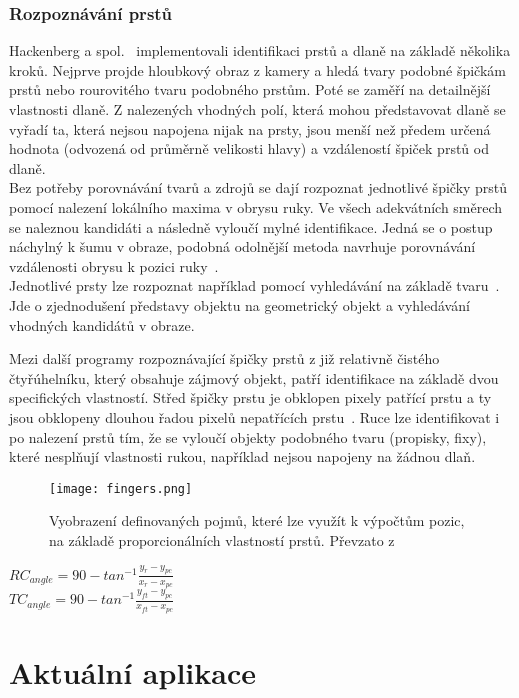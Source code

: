 \subsubsection{Rozpoznávání prstů}
Hackenberg a spol.~\cite{12} implementovali identifikaci prstů a dlaně na základě několika kroků. Nejprve projde hloubkový obraz z kamery a hledá tvary podobné špičkám prstů nebo rourovitého tvaru podobného prstům. Poté se zaměří na detailnější vlastnosti dlaně. Z nalezených vhodných polí, která mohou představovat dlaně se vyřadí ta, která nejsou napojena nijak na prsty, jsou menší než předem určená hodnota (odvozená od průměrně velikosti hlavy) a vzdáleností špiček prstů od dlaně.\\


Bez potřeby porovnávání tvarů a zdrojů se dají rozpoznat jednotlivé špičky prstů pomocí nalezení lokálního maxima v obrysu ruky. Ve všech adekvátních směrech se naleznou kandidáti a následně vyloučí mylné identifikace. Jedná se o postup náchylný k šumu v obraze, podobná odolnější metoda navrhuje porovnávání vzdálenosti obrysu k pozici ruky~\cite{3}.\\
Jednotlivé prsty lze rozpoznat například pomocí vyhledávání na základě tvaru~\cite{4}. Jde o zjednodušení představy objektu na geometrický objekt a vyhledávání vhodných kandidátů v obraze. 

Mezi další programy rozpoznávající špičky prstů z již relativně čistého čtyřúhelníku, který obsahuje zájmový objekt, patří identifikace na základě dvou specifických vlastností. Střed špičky prstu je obklopen pixely patřící prstu a ty jsou obklopeny dlouhou řadou pixelů nepatřících prstu~\cite{14}. Ruce lze identifikovat i po nalezení prstů tím, že se vyloučí objekty podobného tvaru (propisky, fixy), které nesplňují vlastnosti rukou, například nejsou napojeny na žádnou dlaň.

\begin{figure}[h]
\centering
\texttt{[image: fingers.png]}
\caption{Vyobrazení definovaných pojmů, které lze využít k výpočtům pozic, na základě proporcionálních vlastností prstů.
Převzato z ~\cite{13} }
\label{pic8}
\end{figure}
\begin{center}
$RC_{angle} = 90 - tan^{-1} \frac{y_{r}-y_{pc}}{x_{r} - x_{pc}}$ \\
$TC_{angle} = 90 - tan^{-1} \frac{y_{ft}-y_{pc}}{x_{ft} - x_{pc}}$ 
\end{center}
\newpage
\section{Aktuální aplikace}
